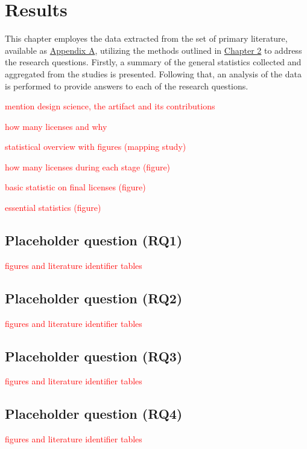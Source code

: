 \chapter{Results\label{results}}
This chapter employes the data extracted from the set of primary literature, available as \hyperref[appendix:a]{Appendix A}, utilizing the methods outlined in \hyperref[methods]{Chapter 2} to address the research questions. Firstly, a summary of the general statistics collected and aggregated from the studies is presented. Following that, an analysis of the data is performed to provide answers to each of the research questions.

\textcolor{red}{mention design science, the artifact and its contributions}

\textcolor{red}{how many licenses and why}

\textcolor{red}{statistical overview with figures (mapping study)}

\textcolor{red}{how many licenses during each stage (figure)}

\textcolor{red}{basic statistic on final licenses (figure)}

\textcolor{red}{essential statistics (figure)}

\section{Placeholder question (RQ1)}
\textcolor{red}{figures and literature identifier tables}
\section{Placeholder question (RQ2)}
\textcolor{red}{figures and literature identifier tables}
\section{Placeholder question (RQ3)}
\textcolor{red}{figures and literature identifier tables}
\section{Placeholder question (RQ4)}
\textcolor{red}{figures and literature identifier tables}